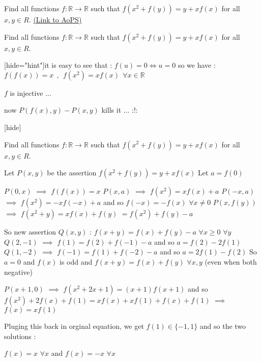 \begin{problem}
	Find all  functions $f: \mathbb{R}\to\mathbb{R}$ such that $f(x^2+f(y))=y+xf(x)$ for all $x,y{\in}R$.
	\flushright \href{https://artofproblemsolving.com/community/c6h563304}{(Link to AoPS)}
\end{problem}



\begin{solution}
	\begin{tcolorbox}Find all  functions $f: \mathbb{R}\to\mathbb{R}$ such that $f(x^2+f(y))=y+xf(x)$ for all $x,y{\in}R$.\end{tcolorbox}


[hide="hint"]it is easy to see that : $f(u)=0\Leftrightarrow u=0$ so we have : $f(f(x))=x\: \: ,\: \: f(x^{2})=xf(x)\: \: \forall x\in \mathbb{R}$

$f$  is injective ...

now $P(f(x),y)-P(x,y)$ kills it ... :!: 

[\/hide]
\end{solution}



\begin{solution}
	\begin{tcolorbox}Find all  functions $f: \mathbb{R}\to\mathbb{R}$ such that $f(x^2+f(y))=y+xf(x)$ for all $x,y{\in}R$.\end{tcolorbox}
Let $P(x,y)$ be the assertion $f(x^2+f(y))=y+xf(x)$
Let $a=f(0)$

$P(0,x)$ $\implies$ $f(f(x))=x$
$P(x,a)$ $\implies$ $f(x^2)=xf(x)+a$
$P(-x,a)$ $\implies$ $f(x^2)=-xf(-x)+a$ and so $f(-x)=-f(x)$ $\forall x\ne 0$
$P(x,f(y))$ $\implies$ $f(x^2+y)=xf(x)+f(y)$ $=f(x^2)+f(y)-a$

So new assertion $Q(x,y)$ : $f(x+y)=f(x)+f(y)-a$ $\forall x\ge 0$ $\forall y$
$Q(2,-1)$ $\implies$ $f(1)=f(2)+f(-1)-a$ and so $a=f(2)-2f(1)$
$Q(1,-2)$ $\implies$ $f(-1)=f(1)+f(-2)-a$ and so $a=2f(1)-f(2)$
So $a=0$ and $f(x)$ is odd and $f(x+y)=f(x)+f(y)$ $\forall x,y$ (even when both negative)

$P(x+1,0)$ $\implies$ $f(x^2+2x+1)=(x+1)f(x+1)$ and so $f(x^2)+2f(x)+f(1)=xf(x)+xf(1)+f(x)+f(1)$ $\implies$ $f(x)=xf(1)$

Pluging this back in orginal equation, we get $f(1)\in\{-1,1\}$ and so the two solutions :

$\boxed{f(x)=x}$ $\forall x$ and $\boxed{f(x)=-x}$ $\forall x$
\end{solution}



